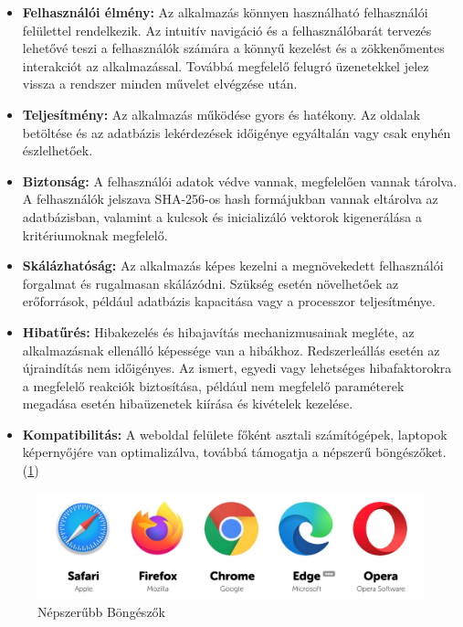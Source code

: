\begin{itemize}
	\item\textbf{Felhasználói élmény:} Az alkalmazás könnyen használható felhasználói felülettel rendelkezik. Az intuitív navigáció és a felhasználóbarát tervezés lehetővé teszi a felhasználók számára a könnyű kezelést és a zökkenőmentes interakciót az alkalmazással. Továbbá megfelelő felugró üzenetekkel jelez vissza a rendszer minden művelet elvégzése után.

	\item\textbf{Teljesítmény:} Az alkalmazás működése gyors és hatékony. Az oldalak betöltése és az adatbázis lekérdezések időigénye egyáltalán vagy csak enyhén észlelhetőek. 

	\item\textbf{Biztonság:} A felhasználói adatok védve vannak, megfelelően vannak tárolva. A felhasználók jelszava SHA-256-os hash formájukban vannak eltárolva az adatbázisban, valamint a kulcsok és inicializáló vektorok kigenerálása a kritériumoknak megfelelő.

	\item\textbf{Skálázhatóság:} Az alkalmazás képes kezelni a megnövekedett felhasználói forgalmat és rugalmasan skálázódni. Szükség esetén növelhetőek az erőforrások, például adatbázis kapacitása vagy a processzor teljesítménye.

\pagebreak
	\item\textbf{Hibatűrés:} Hibakezelés és hibajavítás mechanizmusainak megléte, az alkalmazásnak ellenálló képessége van a hibákhoz. Redszerleállás esetén az újraindítás nem időigényes. Az ismert, egyedi vagy lehetséges hibafaktorokra a megfelelő reakciók biztosítása, például nem megfelelő paraméterek megadása esetén hibaüzenetek kiírása és kivételek kezelése.

	\item\textbf{Kompatibilitás:} A weboldal felülete főként asztali számítógépek, laptopok képernyőjére van optimalizálva, továbbá támogatja a népszerű böngészőket. (\ref{fig:browsers})
\end{itemize}

\begin{figure}[!h]
	\centering
	\includegraphics[scale=0.12]{images/webBrowsers}
	\caption{Népszerűbb Böngészők}
	\label{fig:browsers}
\end{figure}

